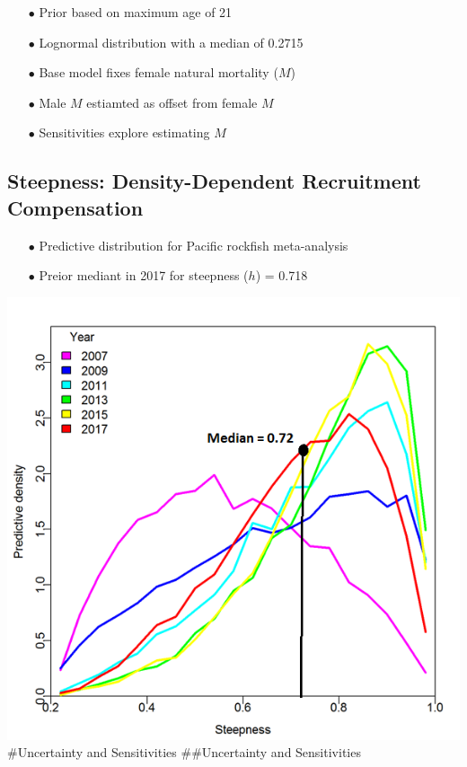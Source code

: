 \documentclass[ignorenonframetext,compress]{beamer}
\begin{document}
\begin{itemize}
\item[$\bullet$] Prior based on maximum age of 21
\item[$\bullet$] Lognormal distribution with a median of 0.2715
\item[$\bullet$] Base model fixes female natural mortality ($M$)
\item[$\bullet$] Male $M$ estiamted as offset from female $M$
\item[$\bullet$] Sensitivities explore estimating $M$
\end{itemize}

\subsection{Steepness: Density-Dependent Recruitment
Compensation}\label{steepness-density-dependent-recruitment-compensation}

\begin{itemize}
\item[$\bullet$] Predictive distribution for Pacific rockfish meta-analysis
\item[$\bullet$] Preior mediant in 2017 for steepness ($h$) = 0.718
\end{itemize}

\includegraphics{Figures/h_prior.png} \#Uncertainty and Sensitivities
\#\#Uncertainty and Sensitivities
\end{document}
